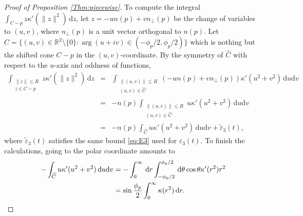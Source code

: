 \documentclass[graybox]{svmult}
\newcommand{\ep}{\varepsilon}
\renewcommand{\d}{\mathrm{d}}  %
\newcommand{\R}{\mathbb{R}}  %
\renewcommand{\AA}{A}  %
\newcommand{\pp}{p}
\begin{document}
\begin{proof}[Proof of Proposition \ref{Thm:piecewise}] 
To compute the integral $\int_{C-\pp} z \kappa'(\|z  \|^2) \,\d z$, let $z= - u n(\pp) + v n_{\perp}(\pp)$ be the change of variables to $(u,v)$, where $n_\perp(\pp)$ is a unit vector orthogonal to $n(\pp)$. Let $\widehat C=\{(u,v)\in \R^2\setminus\{0\}: \arg (u+i v) \in (-\phi_\pp/2,\phi_\pp/2)\}$ which is nothing but the shifted cone $C - \pp$ in the $(u,v)$-coordinate. By the symmetry of $\widehat C$ with respect to the $u$-axis and oddness of functions, 
\begin{eqnarray*}
\int_{\substack{\|z\|\leq R\\ z\in C -\pp}} z \kappa'(\|z\|^2) \,\d z
&=& \int_{\substack{\|(u,v)\|\leq R\\ (u,v)\in \widehat C}} (-u n(\pp) + v n_{\perp}(\pp)) \kappa'(u^2+v^2) \,\d u \d v \\
&=& -n(\pp) \int_{\substack{\|(u,v)\|\leq R\\ (u,v)\in \widehat C}} u \kappa'(u^2+v^2) \,\d u \d v \\
&=& -n(\pp) \int_{\widehat C} u \kappa'(u^2+v^2) \,\d u \d v +\widetilde \ep_3(t),  
\end{eqnarray*}
where $\widetilde \ep_3(t)$ satisfies the same bound \eqref{eq:E3} used for $\ep_3(t)$. 
To finish the calculations, going to the polar coordinate amounts to 
\begin{align}
-\int_{ \widehat C} u \kappa'(u^2+v^2) \,\d u \d v \notag
&= -\int_{0}^\infty \,\d r \int_{-\phi_\pp/2}^{\phi_\pp/2}\,\d\theta \cos \theta \kappa'(r^2) r^2 \notag \\ 
&= \sin \frac{\phi_\pp}{2} \int_0^\infty \kappa(r^2)\,\d r.     \tag*{\qedhere}
\end{align}
\end{proof}


\end{document}
